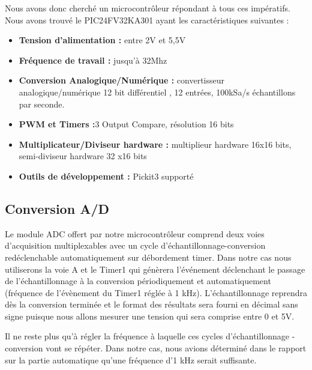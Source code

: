 \documentclass[11pt, french]{article} %
\begin{document}
\vspace{0.5cm}
\noindent
Nous avons donc cherché un microcontrôleur répondant à tous ces impératifs. Nous avons trouvé le PIC24FV32KA301 ayant les caractéristiques suivantes :
\vspace{0.5cm}

\begin{itemize}
\item \textbf{Tension d'alimentation :} entre 2V et 5,5V
\vspace{0.5cm}
\item \textbf{Fréquence de travail :} jusqu'à 32Mhz
\vspace{0.5cm}
\item \textbf{Conversion Analogique/Numérique :} convertisseur analogique/numérique 12 bit différentiel , 12 entrées, 100kSa/s échantillons par seconde. 
\vspace{0.5cm}
\item \textbf{PWM et Timers :}3 Output Compare, résolution 16 bits
\vspace{0.5cm}
\item \textbf{Multiplicateur/Diviseur hardware :} multiplieur hardware 16x16 bits, semi-diviseur hardware 32 x16 bits
\vspace{0.5cm}
\item \textbf{Outils de développement :} Pickit3 supporté

\end{itemize}

\subsection{Conversion A/D}

Le module ADC offert par notre microcontrôleur comprend deux voies d'acquisition multiplexables avec un cycle d'échantillonnage-conversion redéclenchable automatiquement sur débordement timer. Dans notre cas nous utiliserons la voie A et le Timer1 qui génèrera l'événement déclenchant le passage de l'échantillonnage à la conversion périodiquement et automatiquement (fréquence de l'évènement du Timer1 réglée à 1 kHz). L'échantillonnage reprendra dès la conversion terminée et le format des résultats sera fourni en décimal sans signe puisque nous allons mesurer une tension qui sera comprise entre 0 et 5V. 

\vspace{0.5cm}

Il ne reste plus qu'à régler la fréquence à laquelle ces cycles d'échantillonnage - conversion vont se répéter. Dans notre cas, nous avions déterminé dans le rapport sur la partie automatique qu'une fréquence d'1 kHz serait suffisante. 
\end{document}
